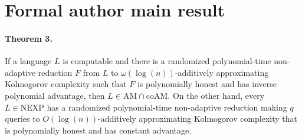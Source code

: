 \section*{Formal author main result}
\paragraph{Theorem 3.} If a language $L$ is computable and there is a randomized polynomial-time non-adaptive reduction $F$ from $L$ to $\omega(\log(n))$-additively approximating Kolmogorov complexity such that $F$ is polynomially honest and has inverse polynomial advantage, then $L\in\mathrm{AM}\cap\mathrm{coAM}$. On the other hand, every $L\in\mathrm{NEXP}$ has a randomized polynomial-time non-adaptive reduction making $q$ queries to $O(\log(n))$-additively approximating Kolmogorov complexity that is polynomially honest and has constant advantage.
